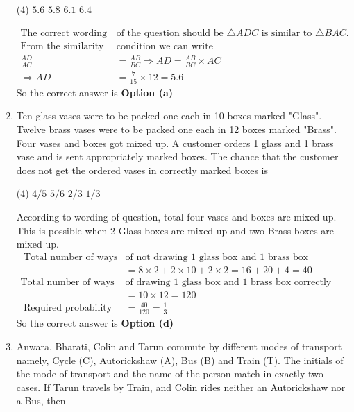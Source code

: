 \begin{enumerate}
 \begin{tasks}(4)
	\task[\textbf{a.}]$5.6$
	\task[\textbf{b.}]$5.8$
	\task[\textbf{c.}] $6.1$
	\task[\textbf{d.}]$6.4$ 
\end{tasks}
\begin{answer}
	\begin{align*}
\text{The correct wording }&\text{of the question should be $\triangle A D C$ is similar to $\triangle B A C$.}\\
	\text{From the similarity }&\text{condition we can write}\\
	\frac{A D}{A C}&=\frac{A B}{B C} \Rightarrow A D=\frac{A B}{B C} \times A C \\
	\Rightarrow A D&=\frac{7}{15} \times 12=5.6
	\end{align*}
	So the correct answer is \textbf{Option (a)}
\end{answer}
\item Ten glass vases were to be packed one each in 10 boxes marked "Glass". Twelve brass vases were to be packed one each in 12 boxes marked "Brass". Four vases and boxes got mixed up. A customer orders 1 glass and 1 brass vase and is sent appropriately marked boxes. The chance that the customer does not get the ordered vases in correctly marked boxes is
 \begin{tasks}(4)
	\task[\textbf{a.}]$4 / 5$
	\task[\textbf{b.}]$5 / 6$
	\task[\textbf{c.}]$2 / 3$
	\task[\textbf{d.}] $1 / 3$
\end{tasks}
\begin{answer}
	 According to wording of question, total four vases and boxes are mixed up. This is possible when 2 Glass boxes are mixed up and two Brass boxes are mixed up.
	\begin{align*}
\text{	Total number of ways }&\text{of not drawing 1 glass box and 1 brass box correctly}\\
	&=8 \times 2+2 \times 10+2 \times 2=16+20+4=40\\
	\text{Total number of ways }&\text{of drawing 1 glass box and 1 brass box correctly}\\
	&=10 \times 12=120\\
\text{	Required probability }&=\frac{40}{120}=\frac{1}{3}
	\end{align*}
		So the correct answer is \textbf{Option (d)}
\end{answer}
\item Anwara, Bharati, Colin and Tarun commute by different modes of transport namely, Cycle (C), Autorickshaw (A), Bus (B) and Train (T). The initials of the mode of transport and the name of the person match in exactly two cases. If Tarun travels by Train, and Colin rides neither an Autorickshaw nor a Bus, then 

\end{enumerate}
